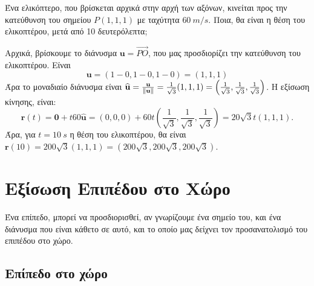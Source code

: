 \begin{example}
  Ένα ελικόπτερο, που βρίσκεται αρχικά στην αρχή των αξόνων, κινείται προς την
  κατεύθυνση του σημείου $P(1,1,1) $ με ταχύτητα $ \SI{60}{m/s} $. Ποια, θα είναι 
  η θέση του ελικοπτέρου, μετά από 10 δευτερόλεπτα;
\end{example}
\begin{solution}
  Αρχικά, βρίσκουμε το διάνυσμα $ \mathbf{u} = \vec{PO} $, που μας προσδιορίζει την
  κατεύθυνση του ελικοπτέρου. Είναι
  \[ \mathbf{u} = (1-0,1-0,1-0) = (1,1,1) \]
  Άρα το μοναδιαίο διάνυσμα είναι $ \mathbf{\widehat{u}} =
  \frac{\mathbf{u}}{\norm{\mathbf{u}}} = \frac{1}{\sqrt{3}} (1,1,1) =
  \left(\frac{1}{\sqrt{3}} , \frac{1}{\sqrt{3}} , \frac{1}{\sqrt{3}}\right) $. Η εξίσωση
  κίνησης, είναι:
  \[
    \mathbf{r}(t) = \mathbf{0} + t 60 \mathbf{\widehat{u}} = (0,0,0) + 60t 
    \left(\frac{1}{\sqrt{3}} , \frac{1}{\sqrt{3}} , \frac{1}{\sqrt{3}}\right) = 
    20 \sqrt{3} t (1,1,1).
  \] 
  Άρα, για $ t= \SI{10}{s} $ η θέση του ελικοπτέρου, θα είναι $ \mathbf{r}(10) = 200
  \sqrt{3} (1,1,1) = (200 \sqrt{3} , 200 \sqrt{3} , 200 \sqrt{3}) $. 
\end{solution}

\chapter*{Εξίσωση Επιπέδου στο Χώρο}



Ένα επίπεδο, μπορεί να προσδιορισθεί, αν γνωρίζουμε ένα σημείο του, και ένα 
διάνυσμα που είναι κάθετο σε αυτό, και το οποίο μας δείχνει τον προσανατολισμό του 
επιπέδου στο χώρο.

\section*{Επίπεδο στο χώρο}

